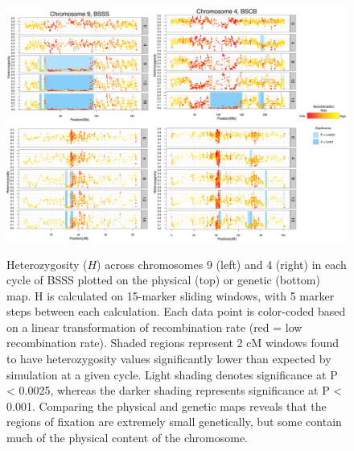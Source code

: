 \begin{figure}[tb]   
  \begin{center}
   \includegraphics[width=\linewidth]{fig45}
   \caption{Heterozygosity ($H$) across chromosomes 9 (left) and 4 (right) in each cycle of BSSS plotted on the physical (top) or genetic (bottom) map. H is calculated on 15-marker sliding windows, with 5 marker steps between each calculation. Each data point is color-coded based on a linear transformation of recombination rate (red = low recombination rate). Shaded regions represent 2 cM windows found to have heterozygosity values significantly lower than expected by simulation at a given cycle. Light shading denotes significance at P < 0.0025, whereas the darker shading represents significance at P < 0.001. Comparing the physical and genetic maps reveals that the regions of fixation are extremely small genetically, but some contain much of the physical content of the chromosome.
} 
\vspace{-6mm}
    \label{fig:genphys}
  \end{center}
\end{figure}




